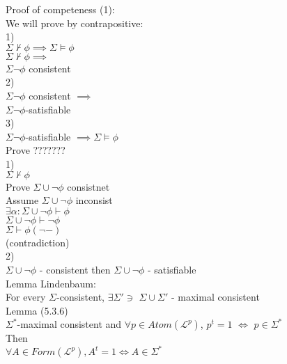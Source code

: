 \documentclass[12pt,oneside,fleqn]{article}
\theoremstyle{definition}
\newcommand{\Lp}{\mathcal{L}^p}
\begin{document}
Proof of competeness (1): \\
We will prove by contrapositive: \\
1) \\
$\Sigma \not \vdash \phi \implies \Sigma \vDash \phi$ \\
$\Sigma \not \vdash \phi \implies$ \\
$\Sigma{\neg \phi}$ consistent \\
2) \\
$\Sigma{\neg \phi}$ consistent $\implies$ \\
$\Sigma{\neg \phi}$-satisfiable \\
3) \\
$\Sigma{\neg \phi}$-satisfiable $\implies \Sigma \vDash \phi$ \\

Prove ??????? \\
1) \\
$\Sigma \not \vdash \phi$ \\ 
Prove $\Sigma \cup {\neg \phi}$ consistnet \\
Assume $\Sigma \cup {\neg \phi} $ inconsist \\
$\exists \alpha : \Sigma \cup { \neg \phi} \vdash \phi$ \\
$\Sigma \cup { \neg \phi} \vdash \neg \phi$ \\
$\Sigma \vdash \phi (\neg -)$ \\
(contradiction) \\
2) \\
$\Sigma \cup { \neg \phi}$ - consistent then $\Sigma \cup { \neg \phi}$ - satisfiable \\

Lemma Lindenbaum: \\
For every $\Sigma$-consistent, $\exists \Sigma' \ni$ $\Sigma \cup \Sigma'$ - maximal consistent \\
 
Lemma (5.3.6) \\
$\Sigma^*$-maximal consistent and $\forall p \in Atom(\Lp)$, $p^t = 1$ $\iff$ $p \in \Sigma^*$ \\
Then \\
$\forall A \in Form(\Lp), A^t = 1 \iff A \in \Sigma^*$ \\
\end{document}
